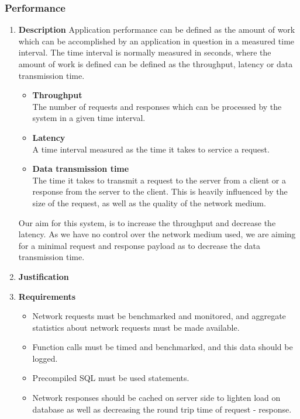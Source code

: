 \documentclass[a4paper,10pt]{article}
\begin{document}
\subsubsection{Performance}
\begin{enumerate}
\item \textbf{Description}
Application performance can be defined as the amount of work which can be accomplished by an application in question in a measured time interval. The time interval is normally measured in seconds, where the amount of work is defined can be defined as the throughput, latency or data transmission time.
	\begin{itemize}
		\item \textbf{Throughput} \\
		The number of requests and responses which can be processed by the system in a given time interval.
		\item \textbf{Latency} \\
		A time interval measured as the time it takes to service a request. 
		\item \textbf{Data transmission time} \\
		The time it takes to transmit a request to the server from a client or a response from the server to the client. This is heavily influenced by the size of the request, as well as the quality of the network medium.
	\end{itemize}
	
	Our aim for this system, is to increase the throughput and decrease the latency. As we have no control over the network medium used, we are aiming for a minimal request and response payload as to decrease the data transmission time.
\item \textbf{Justification}
\item \textbf{Requirements}
	\begin{itemize}
		\item Network requests must be benchmarked and monitored, and aggregate statistics about network requests must be made available.
		\item Function calls must be timed and benchmarked, and this data should be logged.
		\item Precompiled SQL must be used statements.
		\item Network responses should be cached on server side to lighten load on database as well as decreasing the round trip time of request - response.
		\end{itemize}
\end{enumerate}
\end{document}
